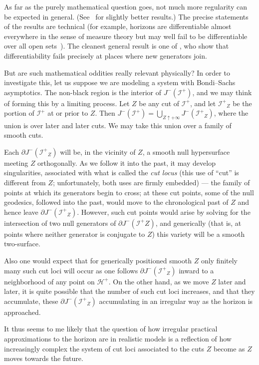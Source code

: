 \documentclass[12pt]{article}
\newcommand{\scrif}{{{\mathscr I}^{+}}}
\newcommand{\Hf}{{{\mathscr H}^{+}}} %
\begin{document}
As far as the purely mathematical question goes, not much more regularity can be expected in general.  (See~\citet{Chrusciel:2001,Chrusciel:2002} for slightly better results.)  The precise statements of the results are technical (for example, horizons are differentiable almost everywhere in the sense of measure theory but may well fail to be differentiable over all open sets~\citep{Chrusciel:1998}).   The cleanest general result is one of \citet{Beem:1998}, who show that differentiability fails precisely at places where new generators join.

But are such mathematical oddities really relevant physically?  In order to investigate this, let us suppose we are modeling a system with Bondi--Sachs asymptotics. 
The non-black region is the interior of $J^-(\scrif )$, and we may think of forming this by a limiting process.  Let $Z$ be any cut of $\scrif$, and let $\scrif _Z$ be the portion of $\scrif$ at or prior to $Z$.  Then $J^-(\scrif )=\bigcup _{Z\uparrow +\infty} J^-(\scrif _Z)$, where the union is over later and later cuts.   We may take this union over a family of smooth cuts.

Each $\partial J^-(\scrif _Z)$ will be, in the vicinity of $Z$, a smooth null hypersurface meeting $Z$ orthogonally.  As we follow it into the past, it may develop singularities, associated with what is called the {\em cut locus} (this use of ``cut'' is different from $Z$; unfortunately, both uses are firmly embedded) --- the family of points at which its generators begin to cross; at these cut points, some of the null geodesics, followed into the past, would move to the chronological past of $Z$ and hence leave $\partial J^-(\scrif _Z)$.  However, such cut points would arise by solving for the intersection of two null generators of $\partial J^-(\scrif Z)$, and generically (that is, at points where neither generator is conjugate to $Z$) this variety will be a smooth two-surface.  

Also one would expect that for generically positioned smooth $Z$ only finitely many such cut loci will occur as one follows $\partial J^-(\scrif _Z)$ inward to a neighborhood of any point on $\Hf$.  On the other hand, as we move $Z$ later and later, it is quite possible that the number of such cut loci increases, and that they accumulate, these $\partial J^-(\scrif _Z)$ accumulating in an irregular way as the horizon is approached.

It thus seems to me likely that the question of how irregular practical approximations to the horizon are in realistic models is a reflection of how increasingly complex the system of cut loci associated to the cuts $Z$ become as $Z$ moves towards the future.
\end{document}
